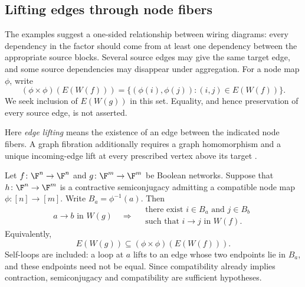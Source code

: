 \subsection{Lifting edges through node fibers}

The examples suggest a one-sided relationship between wiring diagrams: every dependency in the factor should come from at least one dependency between the appropriate source blocks. Several source edges may give the same target edge, and some source dependencies may disappear under aggregation. For a node map $\phi$, write
\[
    (\phi\times\phi)(E(W(f)))
    =\{(\phi(i),\phi(j)):(i,j)\in E(W(f))\}.
\]
We seek inclusion of $E(W(g))$ in this set. Equality, and hence preservation of every source edge, is not asserted.

Here \emph{edge lifting} means the existence of an edge between the indicated node fibers. A graph fibration additionally requires a graph homomorphism and a unique incoming-edge lift at every prescribed vertex above its target \cite[Definition~3.1]{deville2015dynamics}.

\begin{theorem}\label{thm:compatible-edge-lifting}
    Let $f\colon\F^n\to\F^n$ and $g\colon\F^m\to\F^m$ be Boolean networks. Suppose that $h\colon\F^n\to\F^m$ is a contractive semiconjugacy admitting a compatible node map $\phi\colon[n]\to[m]$. Write $B_a=\phi^{-1}(a)$. Then
    \begin{equation}\label{eq:compatible-edge-lifting}
        a\longrightarrow b\text{ in }W(g)
        \quad\Longrightarrow\quad
        \begin{gathered}
            \text{there exist }i\in B_a\text{ and }j\in B_b\\
            \text{such that }i\longrightarrow j\text{ in }W(f).
        \end{gathered}
    \end{equation}
    Equivalently,
    \[
        E(W(g))\subseteq(\phi\times\phi)(E(W(f))).
    \]
    Self-loops are included: a loop at $a$ lifts to an edge whose two endpoints lie in $B_a$, and these endpoints need not be equal. Since compatibility already implies contraction, semiconjugacy and compatibility are sufficient hypotheses.
\end{theorem}

